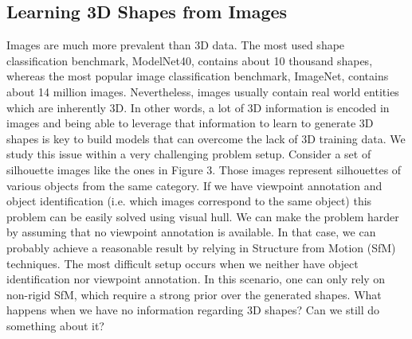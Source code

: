 \subsection*{Learning 3D Shapes from Images}

Images are much more prevalent than 3D data.
The most used shape classification benchmark, ModelNet40, contains about 10 thousand shapes,
whereas the most popular image classification benchmark, ImageNet, contains about 14 million images.
Nevertheless, images usually contain real world entities which are inherently 3D.
In other words, a lot of 3D information is encoded in images and being able to leverage that information
to learn to generate 3D shapes is key to build models that can overcome the lack of 3D training data.
We study this issue within a very challenging problem setup.
Consider a set of silhouette images like the ones in Figure 3.
Those images represent silhouettes of various objects from the same category.
If we have viewpoint annotation and object identification (i.e. which images correspond to the same object) this problem can be easily solved using visual hull.
We can make the problem harder by assuming that no viewpoint annotation is available.
In that case, we can probably achieve a reasonable result by relying in Structure from Motion (SfM) techniques.
The most difficult setup occurs when we neither have object identification nor viewpoint annotation.
In this scenario, one can only rely on non-rigid SfM, which require a strong prior over the generated shapes.
What happens when we have no information regarding 3D shapes? Can we still do something about it?


